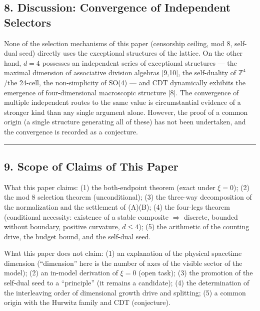 \documentclass[
]{article}
\begin{document}
\subsection{8. Discussion: Convergence of Independent
Selectors}\label{discussion-convergence-of-independent-selectors}

None of the selection mechanisms of this paper (censorship ceiling, mod
8, self-dual seed) directly uses the exceptional structures of the
lattice. On the other hand, \(d=4\) possesses an independent series of
exceptional structures --- the maximal dimension of associative division
algebras {[}9,10{]}, the self-duality of \(\mathbb{Z}^4\)/the 24-cell,
the non-simplicity of SO(4) --- and CDT dynamically exhibits the
emergence of four-dimensional macroscopic structure {[}8{]}. The
convergence of multiple independent routes to the same value is
circumstantial evidence of a stronger kind than any single argument
alone. However, the proof of a common origin (a single structure
generating all of these) has not been undertaken, and the convergence is
recorded as a conjecture.

\begin{center}\rule{0.5\linewidth}{0.5pt}\end{center}

\subsection{9. Scope of Claims of This
Paper}\label{scope-of-claims-of-this-paper}

What this paper claims: (1) the both-endpoint theorem (exact under
\(\xi=0\)); (2) the mod 8 selection theorem (unconditional); (3) the
three-way decomposition of the normalization and the settlement of
(A)(B); (4) the four-legs theorem (conditional necessity: existence of a
stable composite $\Longrightarrow$ discrete, bounded without boundary, positive
curvature, \(d\le4\)); (5) the arithmetic of the counting drive, the
budget bound, and the self-dual seed.

What this paper does not claim: (1) an explanation of the physical
spacetime dimension (``dimension'' here is the number of axes of the
visible sector of the model); (2) an in-model derivation of \(\xi=0\)
(open task); (3) the promotion of the self-dual seed to a ``principle''
(it remains a candidate); (4) the determination of the interleaving
order of dimensional growth drive and splitting; (5) a common origin
with the Hurwitz family and CDT (conjecture).
\end{document}
